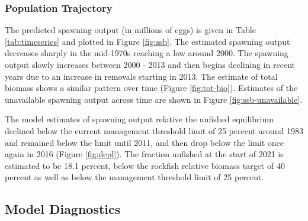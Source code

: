 \documentclass[11pt,
  english,
  a4paper,
]{article}
\begin{document}
\leavevmode\tagmcend\tagstructend\par


\hypertarget{population-trajectory}{%
\subsubsection{Population Trajectory}\label{population-trajectory}}

\leavevmode\tagmcend\tagstructend


The predicted spawning output (in millions of eggs) is given in Table \ref{tab:timeseries} and plotted in Figure \ref{fig:ssb}. The estimated spawning output decreases sharply in the mid-1970s reaching a low around 2000. The spawning output slowly increases between 2000 - 2013 and then begins declining in recent years due to an increase in removals starting in 2013. The estimate of total biomass shows a similar pattern over time (Figure \ref{fig:tot-bio}). Estimates of the unavailable spawning output across time are shown in Figure \ref{fig:ssb-unavailable}.

\leavevmode\tagmcend\tagstructend\par


The model estimates of spawning output relative the unfished equilibrium declined below the current management threshold limit of 25 percent around 1983 and remained below the limit until 2011, and then drop below the limit once again in 2016 (Figure \ref{fig:depl}). The fraction unfished at the start of 2021 is estimated to be 18.1 percent, below the rockfish relative biomass target of 40 percent as well as below the management threshold limit of 25 percent.

\leavevmode\tagmcend\tagstructend\par


\hypertarget{model-diagnostics}{%
\subsection{Model Diagnostics}\label{model-diagnostics}}

\leavevmode\tagmcend\tagstructend

\end{document}
